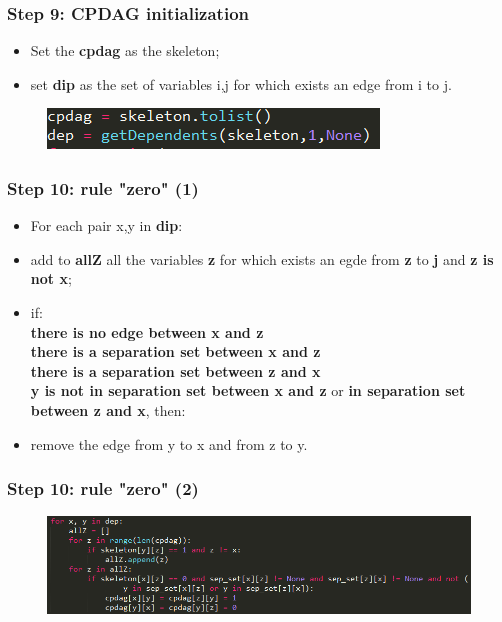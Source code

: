 \documentclass[xcolor ={table,usenames,dvipsnames}]{beamer}
\theoremstyle{definition}
\begin{document}
\begin{frame}
\frametitle{Step 9: CPDAG initialization}
\begin{itemize}
	\item Set the \textbf{cpdag} as the skeleton;
	\item set \textbf{dip} as the set of variables i,j for which exists an edge from i to j.
\end{itemize}
	\begin{figure}[h!]
		\centering
		\includegraphics[scale=0.8]{img/cpdaginit.PNG}
		\label{Interfacce di un CS}
	\end{figure}
\end{frame}
\begin{frame}
\frametitle{Step 10: rule "zero" (1)}
\begin{itemize}
	\item For each pair x,y in \textbf{dip}:
	\item add to \textbf{allZ} all the variables \textbf{z} for which exists an egde from \textbf{z} to \textbf{j} and \textbf{z is not x};
	\item if:\\\textbf{there is no edge between x and z}\\ \textbf{there is a separation set between x and z}\\\textbf{there is a separation set between z and x}\\\textbf{y is not in separation set between x and z} or \textbf{in separation set between z and x}, then:
	\item remove the edge from y to x and from z to y.
\end{itemize}
\end{frame}
\begin{frame}
\frametitle{Step 10: rule "zero" (2)}
	\begin{figure}[h!]
		\centering
		\includegraphics[scale=0.52]{img/rulezero.PNG}
		\label{Interfacce di un CS}
	\end{figure}
\end{frame}
\end{document}
